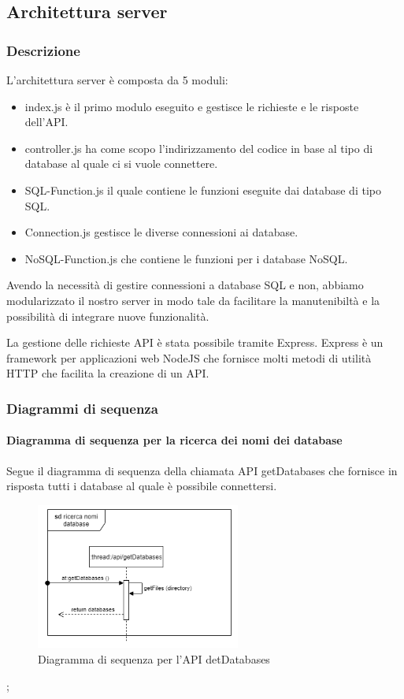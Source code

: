         \pagebreak
        
\subsection{Architettura server}
    \subsubsection{Descrizione}
    L'architettura server è composta da 5 moduli:
    \begin{itemize}
            \item index.js è il primo modulo eseguito e gestisce le richieste e le risposte dell'API.
            \item  controller.js ha come scopo l'indirizzamento del codice in base al tipo di database al quale ci si vuole connettere.
            \item SQL-Function.js il quale contiene le funzioni eseguite dai database di tipo SQL.
            \item Connection.js gestisce le diverse connessioni ai database.
            \item NoSQL-Function.js che contiene le funzioni per i database NoSQL.
        \end{itemize}
    Avendo la necessità di gestire connessioni a database SQL e non, abbiamo modularizzato il nostro server in modo tale da facilitare la manutenibiltà e la possibilità di integrare nuove funzionalità.
    
    La gestione delle richieste API è stata possibile tramite Express. Express è un framework per applicazioni web NodeJS che fornisce molti metodi di utilità HTTP che facilita la creazione di un API.
    
    \subsubsection{Diagrammi di sequenza}
    
    \paragraph{Diagramma di sequenza per la ricerca dei nomi dei database}
     Segue il diagramma di sequenza della chiamata API getDatabases che fornisce in risposta tutti i database al quale è possibile connettersi.
            \begin{figure}[H]
                \centering\includegraphics[width=0.6\textwidth]{source/img/API_getDatabases.png}
                \caption{Diagramma di sequenza per l'API detDatabases}
            \end{figure}
            \pagebreak;
            
